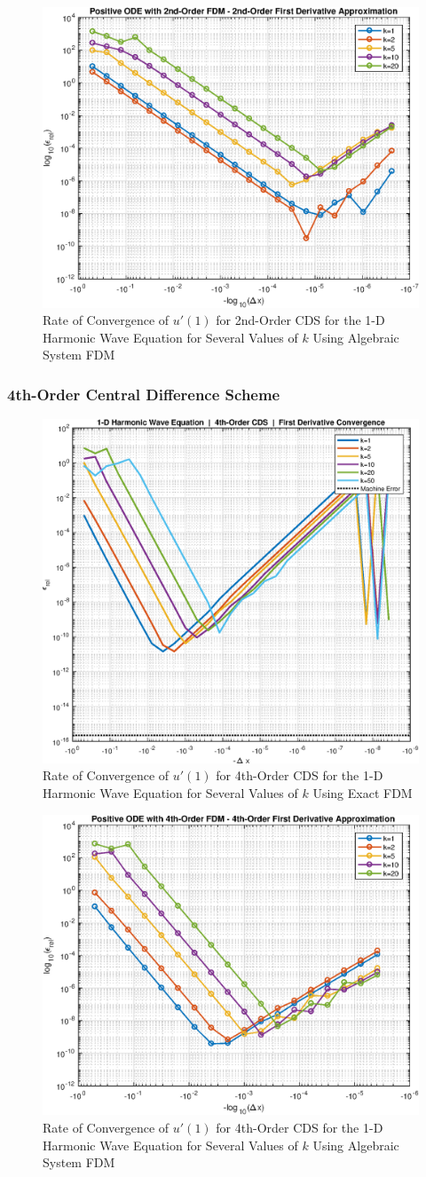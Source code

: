 \documentclass[10pt]{article}		%
\numberwithin{equation}{section}
\begin{document}
\begin{figure}[H]
	\begin{center}
		\includegraphics[width = 0.5\linewidth]{positive_ode_order_2_fd_order_2}
		\caption{Rate of Convergence of $u'(1)$ for 2nd-Order CDS for the 1-D Harmonic Wave Equation for Several Values of $k$ Using Algebraic System FDM}	
	\end{center}
\end{figure}

\subsubsection{4th-Order Central Difference Scheme}

\begin{figure}[H]
	\begin{center}
		\includegraphics[width = 0.5\linewidth]{1dwave4oconv}
		\caption{Rate of Convergence of $u'(1)$ for 4th-Order CDS for the 1-D Harmonic Wave Equation for Several Values of $k$ Using Exact FDM}	
	\end{center}
\end{figure}

\begin{figure}[H]
	\begin{center}
		\includegraphics[width = 0.5\linewidth]{positive_ode_order_4_fd_order_4}
		\caption{Rate of Convergence of $u'(1)$ for 4th-Order CDS for the 1-D Harmonic Wave Equation for Several Values of $k$ Using Algebraic System FDM}	
	\end{center}
\end{figure}
\end{document}

